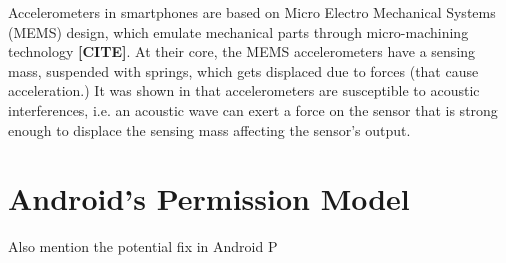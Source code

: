Accelerometers in smartphones are based on Micro Electro Mechanical Systems (MEMS) design, which emulate mechanical parts through micro-machining technology \textbf{[CITE]}. At their core, the MEMS accelerometers have a sensing mass, suspended with springs, which gets displaced due to forces (that cause acceleration.) It was shown in \cite{walnut} that accelerometers are susceptible to acoustic interferences, i.e. an acoustic wave can exert a force on the sensor that is strong enough to displace the sensing mass affecting the sensor's output.



\section{Android's Permission Model}
Also mention the potential fix in Android P

\lipsum[2]

